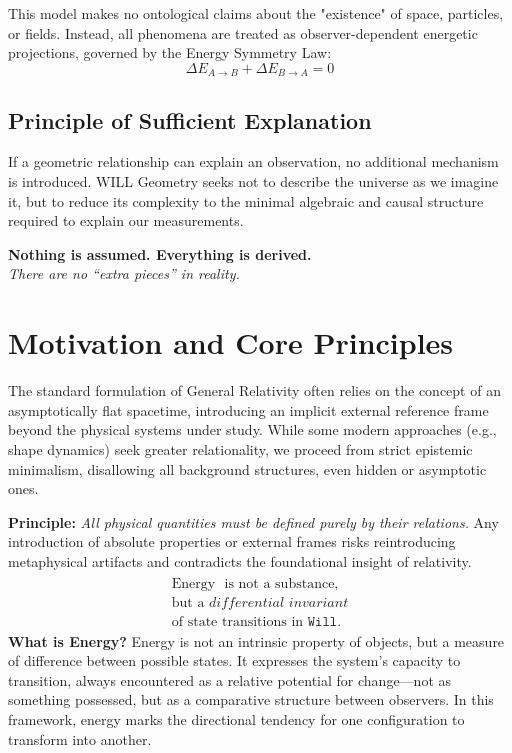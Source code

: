 \documentclass{article}
\begin{document}
This model makes no ontological claims about the "existence" of space, particles, or fields. Instead, all phenomena are treated as observer-dependent energetic projections, governed by the Energy Symmetry Law:
\[
\boxed{
\Delta E_{A \rightarrow B} + \Delta E_{B \rightarrow A} = 0
}
\]

\subsection{Principle of Sufficient Explanation}

If a geometric relationship can explain an observation, no additional mechanism is introduced. WILL Geometry seeks not to describe the universe as we imagine it, but to reduce its complexity to the minimal algebraic and causal structure required to explain our measurements.

\begin{tcolorbox}[colback=gray!5, colframe=black!80!black, title=Guiding Principle]
\textbf{Nothing is assumed. Everything is derived.}\\
\textit{There are no “extra pieces” in reality.}
\end{tcolorbox}



\section{Motivation and Core Principles}

The standard formulation of General Relativity often relies on the concept of an asymptotically flat spacetime, introducing an implicit external reference frame beyond the physical systems under study. While some modern approaches (e.g., shape dynamics) seek greater relationality, we proceed from strict epistemic minimalism, disallowing all background structures, even hidden or asymptotic ones.

\textbf{Principle:} \emph{All physical quantities must be defined purely by their relations.} Any introduction of absolute properties or external frames risks reintroducing metaphysical artifacts and contradicts the foundational insight of relativity.
\[
\begin{array}{c} \boxed{ 
\begin{array}{c} 
\text{Energy } \text{ is not a substance,} \\ 
\text{but a } \textit{differential invariant} \\ 
\text{of state transitions in } \mathtt{Will}. 
\end{array} 
} \end{array}
\]
\vspace{1em}
\textbf{What is Energy?} Energy is not an intrinsic property of objects, but a measure of difference between possible states. It expresses the system's capacity to transition, always encountered as a relative potential for change—not as something possessed, but as a comparative structure between observers. In this framework, energy marks the directional tendency for one configuration to transform into another. 
\end{document}
